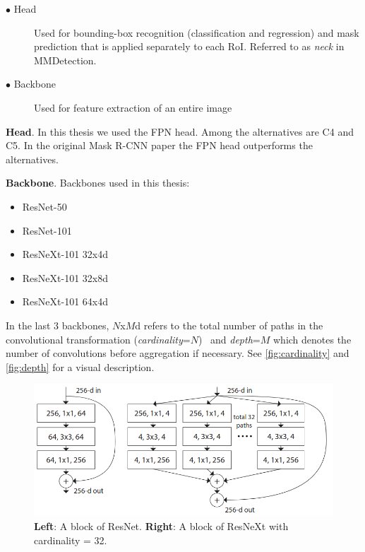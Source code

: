 \documentclass[oneside, english, bibtex]{kththesis}
\begin{document}
\begin{description}
\item[$\bullet$ Head] Used for bounding-box recognition (classification and regression) and mask prediction that is applied separately to each RoI. Referred to as \textit{neck} in MMDetection.
\item[$\bullet$ Backbone] Used for feature extraction of an entire image
\end{description}

\textbf{Head}. In this thesis we used the FPN head. Among the alternatives are C4 and C5. In the original Mask R-CNN paper the FPN head outperforms the alternatives. 

\textbf{Backbone}. Backbones used in this thesis:

\begin{itemize}
\item ResNet-50
\item ResNet-101
\item ResNeXt-101 32x4d 
\item ResNeXt-101 32x8d
\item ResNeXt-101 64x4d
\end{itemize}


In the last 3 backbones, $N$x$M$d refers to the total number of paths in the convolutional transformation (\textit{cardinality}=$N$)~\cite{DBLP:journals/corr/XieGDTH16} and \textit{depth}=$M$ which denotes the number of convolutions before aggregation if necessary. See \autoref{fig:cardinality} and \autoref{fig:depth} for a visual description.

\begin{figure}[H]
  \begin{center}
    \includegraphics[width=1.0\textwidth]{figures/resnext-cardinality.png}
  \end{center}
  \caption{\textbf{Left}: A block of ResNet. \textbf{Right}: A block of ResNeXt with cardinality = 32. ~\cite{DBLP:journals/corr/XieGDTH16}}
  \label{fig:cardinality}
\end{figure}
\end{document}
